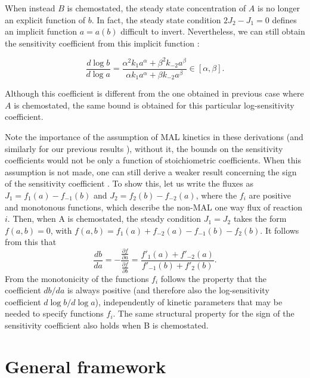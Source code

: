 \documentclass{article}
\begin{document}
	When instead $B$ is chemostated, the steady state concentration of $A$ is no longer an explicit function of $b$. In fact, the steady state condition $2 J_2 - J_1 =0$ defines an implicit function $a=a(b)$ difficult to invert. Nevertheless, we can still obtain the sensitivity coefficient from this implicit function :
	\begin{center}
		\begin{equation}
			\label{eq:bound_B_chem}
			\frac{d\log b}{d \log a}= \frac{\alpha^2 k_1 a^{\alpha}+\beta^2 k_{-2} a^{\beta}}{\alpha k_{1} a^{\alpha}+\beta k_{-2} a^{\beta}} \in [\alpha, \beta].
		\end{equation}
	\end{center}
	Although this coefficient is different from the one obtained in previous case where $A$ is chemostated, the same bound is obtained for this particular log-sensitivity coefficient.
	
	Note the importance of the assumption of MAL kinetics in these derivations (and similarly for our previous results \cite{4}), without it, the bounds on the sensitivity coefficients would not be only a function of stoichiometric coefficients. When this assumption is not made, one can still derive a weaker result concerning the sign of the sensitivity coefficient  \cite{giordano_computing_2016}. To show this, let us write the fluxes as $J_1=f_1(a)-f_{-1}(b)$ and $J_2=f_2(b)-f_{-2}(a)$, where the $f_i$ are positive and monotonous functions, which describe the non-MAL one way flux of reaction $i$. Then, when A is chemostated, the steady condition $J_1=J_2$ takes the form $f(a,b)=0$, with $f(a,b)=f_1(a)+f_{-2}(a)-f_{-1}(b)-f_{2}(b)$. It follows from this that 
	\begin{equation}
		\label{eq:bound_A_chem}
		\frac{d b}{d a}= -\frac{ \frac{\partial f}{\partial a} }{ \frac{\partial f}{\partial b} }= \frac{f'_1(a)+f'_{-2}(a)}{f'_{-1}(b)+f'_2(b)}.
	\end{equation}
	From the monotonicity of the functions $f_i$ follows the property that the coefficient $db/da$ is always positive (and therefore also the log-sensitivity coefficient $d \log b/ d \log a$), independently of kinetic parameters that may be needed to specify functions $f_i$. The same structural property for the sign of the sensitivity coefficient also holds when B is chemostated.
	
	\section{General framework}
	
\end{document}
